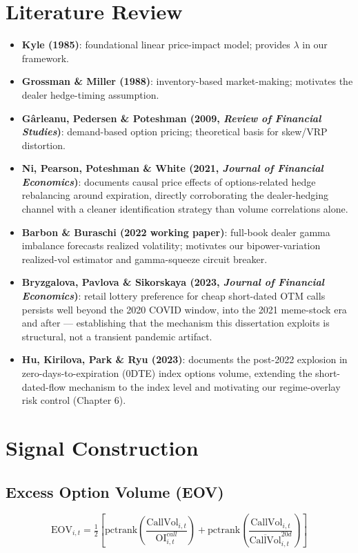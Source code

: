 \documentclass[11pt]{report}
\begin{document}
\chapter{Literature Review}

\begin{itemize}
    \item \textbf{Kyle (1985)}: foundational linear price-impact model; provides
    $\lambda$ in our framework.
    \item \textbf{Grossman \& Miller (1988)}: inventory-based market-making; motivates
    the dealer hedge-timing assumption.
    \item \textbf{Gârleanu, Pedersen \& Poteshman (2009, \textit{Review of Financial
    Studies})}: demand-based option pricing; theoretical basis for skew/VRP distortion.
    \item \textbf{Ni, Pearson, Poteshman \& White (2021, \textit{Journal of Financial
    Economics})}: documents causal price effects of options-related hedge rebalancing
    around expiration, directly corroborating the dealer-hedging channel with a cleaner
    identification strategy than volume correlations alone.
    \item \textbf{Barbon \& Buraschi (2022 working paper)}: full-book dealer gamma
    imbalance forecasts realized volatility; motivates our bipower-variation realized-vol
    estimator and gamma-squeeze circuit breaker.
    \item \textbf{Bryzgalova, Pavlova \& Sikorskaya (2023, \textit{Journal of Financial
    Economics})}: retail lottery preference for cheap short-dated OTM calls persists
    well beyond the 2020 COVID window, into the 2021 meme-stock era and after ---
    establishing that the mechanism this dissertation exploits is structural, not a
    transient pandemic artifact.
    \item \textbf{Hu, Kirilova, Park \& Ryu (2023)}: documents the post-2022 explosion in
    zero-days-to-expiration (0DTE) index options volume, extending the short-dated-flow
    mechanism to the index level and motivating our regime-overlay risk control
    (Chapter 6).
\end{itemize}

\chapter{Signal Construction}

\section{Excess Option Volume (EOV)}
\begin{equation}
    \text{EOV}_{i,t} = \tfrac{1}{2}\left[
        \text{pctrank}\!\left(\frac{\text{CallVol}_{i,t}}{\text{OI}^{call}_{i,t}}\right)
        + \text{pctrank}\!\left(\frac{\text{CallVol}_{i,t}}{\overline{\text{CallVol}}_{i,t}^{20d}}\right)
    \right]
\end{equation}
\end{document}
